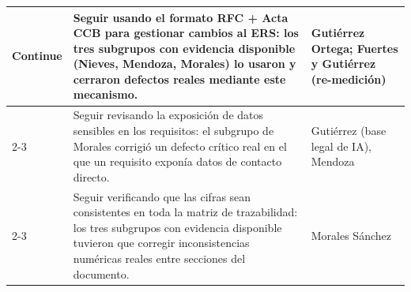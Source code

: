 \documentclass[12pt,a4paper]{article}
\begin{document}
\begin{longtable}{|p{2.2cm}|p{7.3cm}|p{4.3cm}|}
	\multirow{3}{*}{Continue}
	& Seguir usando el formato RFC + Acta CCB para gestionar cambios al ERS: los tres subgrupos con evidencia disponible (Nieves, Mendoza, Morales) lo usaron y cerraron defectos reales mediante este mecanismo. & Gutiérrez Ortega; Fuertes y Gutiérrez (re-medición) \\
	\cline{2-3}
	& Seguir revisando la exposición de datos sensibles en los requisitos: el subgrupo de Morales corrigió un defecto crítico real en el que un requisito exponía datos de contacto directo. & Gutiérrez (base legal de IA), Mendoza \\
	\cline{2-3}
	& Seguir verificando que las cifras sean consistentes en toda la matriz de trazabilidad: los tres subgrupos con evidencia disponible tuvieron que corregir inconsistencias numéricas reales entre secciones del documento. & Morales Sánchez \\
	\hline
\end{longtable}
\end{document}

